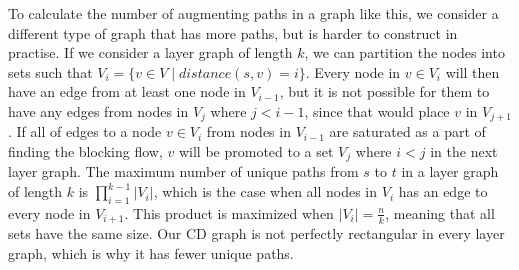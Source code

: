 To calculate the number of augmenting paths in a graph like this, we consider a different type of graph that has more paths, but is harder to construct in practise.
If we consider a layer graph of length $k$, we can partition the nodes into sets such that $V_i = \{ v\in V \mid distance(s, v) = i\}$.
Every node in $v\in V_i$ will then have an edge from at least one node in $V_{i-1}$, 
but it is not possible for them to have any edges from nodes in $V_j$ where $j<i-1$, since that would place $v$ in $V_{j+1}$. 
If all of edges to a node $v\in V_i$ from nodes in $V_{i-1}$ are saturated as a part of finding the blocking flow, 
$v$ will be promoted to a set $V_j$ where $i<j$ in the next layer graph.
The maximum number of unique paths from $s$ to $t$ in a layer graph of length $k$ is $\prod_{i=1}^{k-1}{|V_i|}$, 
which is the case when all nodes in $V_i$ has an edge to every node in $V_{i+1}$.
This product is maximized when $|V_i|=\frac{n}{k}$, meaning that all sets have the same size. 
Our CD graph is not perfectly rectangular in every layer graph, which is why it has fewer unique paths.

